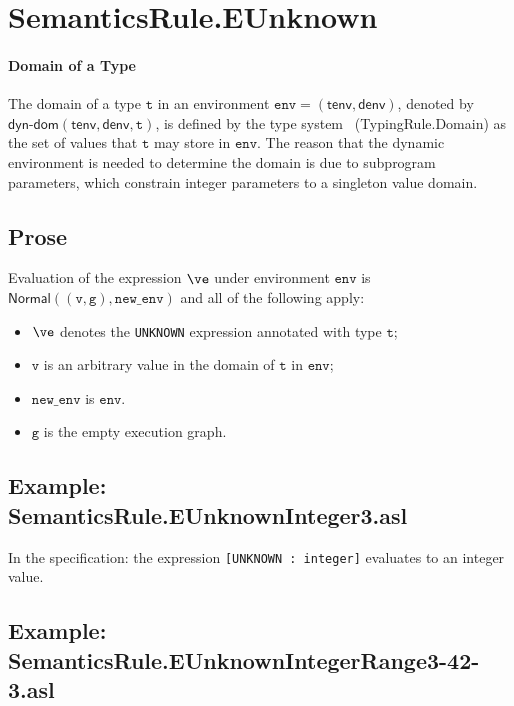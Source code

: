 \documentclass{book}
\newcommand\tenv[0]{\textsf{tenv}}
\newcommand\denv[0]{\textsf{denv}}
\newcommand\Normal[0]{\textsf{Normal}}
\newcommand\newenv[0]{\texttt{new\_env}}
\newcommand\env[0]{\texttt{env}}
\newcommand\vg[0]{\texttt{g}}
\newcommand\vv[0]{\texttt{v}}
\newcommand\vt[0]{\texttt{t}}
\begin{document}

\section{SemanticsRule.EUnknown \label{sec:SemanticsRule.EUnknown}}
  \paragraph{Domain of a Type}
  The domain of a type $\vt$ in an environment $\env=(\tenv,\denv)$,
  denoted by $\textsf{dyn-dom}(\tenv, \denv, \vt)$, is defined by the type system~\cite{ASLTypingReference}
  (TypingRule.Domain)
  as the set of values that $\vt$ may store in $\env$. The reason that the dynamic environment is
  needed to determine the domain is due to subprogram parameters, which constrain integer parameters to
  a singleton value domain.

  \subsection{Prose}
  Evaluation of the expression $\ve$ under environment $\env$ is \\
  $\Normal((\vv, \vg), \newenv)$ and all of the following apply:
  \begin{itemize}
  \item $\ve$ denotes the \texttt{UNKNOWN} expression annotated with type $\vt$;
  \item $\vv$ is an arbitrary value in the domain of $\vt$ in $\env$;
  \item $\newenv$ is $\env$.
  \item $\vg$ is the empty execution graph.
  \end{itemize}

  \subsection{Example: SemanticsRule.EUnknownInteger3.asl}
    In the specification:
    the expression \texttt{[UNKNOWN : integer]} evaluates to an integer value.

  \subsection{Example: \\ SemanticsRule.EUnknownIntegerRange3-42-3.asl}
\end{document}
